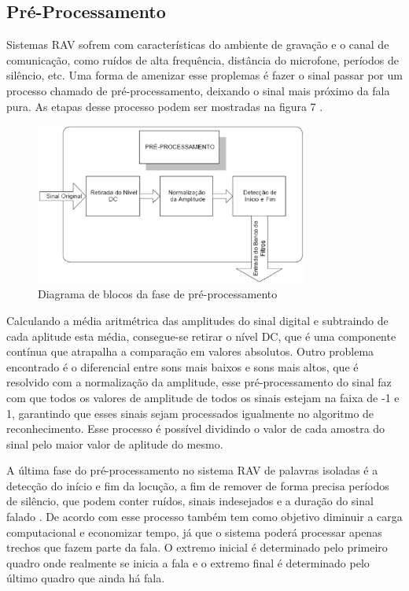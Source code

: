 \subsection{Pré-Processamento}
Sistemas RAV sofrem com características do ambiente de gravação e o canal de comunicação, como ruídos de alta frequência, distância do microfone, períodos de silêncio, etc. Uma forma de amenizar esse proplemas é fazer o sinal passar por um processo chamado de pré-processamento, deixando o sinal mais próximo da fala pura. As etapas desse processo podem ser mostradas na figura 7 \cite{RavIsolAnderson}. 

\begin{figure}[H]
\includegraphics[width=0.8\textwidth]{graficos/pre_proc.eps}
\caption{Diagrama de blocos da fase de pré-processamento}
\end{figure}

Calculando a média aritmétrica das amplitudes do sinal digital e subtraindo de cada aplitude esta média, consegue-se retirar o nível DC, que é uma componente contínua que atrapalha a comparação em valores absolutos. Outro problema encontrado é o diferencial entre sons mais baixos e sons mais altos, que é resolvido com a normalização da amplitude, esse pré-processamento do sinal faz com que todos os valores de amplitude de todos os sinais estejam na faixa de -1 e 1, garantindo que esses sinais sejam processados igualmente no algoritmo de reconhecimento. Esse processo é possível dividindo o valor de cada amostra do sinal pelo maior valor de aplitude do mesmo. 

A última fase do pré-processamento no sistema RAV de palavras isoladas é a detecção do início e fim da locução, a fim de remover de forma precisa períodos de silêncio, que podem conter ruídos, sinais indesejados e a duração do sinal falado \cite{RavIsolAnderson}. De acordo com  esse processo também tem como objetivo diminuir a carga computacional e economizar tempo, já que o sistema poderá processar apenas trechos que fazem parte da fala.
 O extremo inicial é determinado pelo primeiro quadro onde realmente se inicia a fala e o extremo final é
determinado pelo último quadro que ainda há fala.


